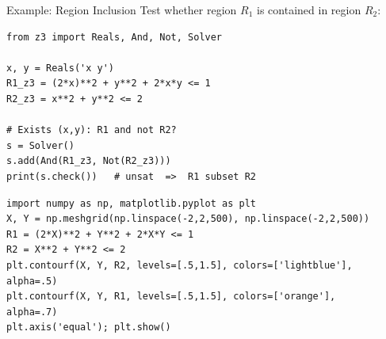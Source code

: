 \documentclass[aspectratio=169]{beamer}
\begin{document}
\begin{frame}[fragile]{Example: Region Inclusion}
  Test whether region $R_{1}$ is contained in region $R_{2}$:

  \begin{lstlisting}[style=python]
from z3 import Reals, And, Not, Solver

x, y = Reals('x y')
R1_z3 = (2*x)**2 + y**2 + 2*x*y <= 1
R2_z3 = x**2 + y**2 <= 2

# Exists (x,y): R1 and not R2?
s = Solver()
s.add(And(R1_z3, Not(R2_z3)))
print(s.check())   # unsat  =>  R1 subset R2
  \end{lstlisting}

  \begin{lstlisting}[style=python]
import numpy as np, matplotlib.pyplot as plt
X, Y = np.meshgrid(np.linspace(-2,2,500), np.linspace(-2,2,500))
R1 = (2*X)**2 + Y**2 + 2*X*Y <= 1
R2 = X**2 + Y**2 <= 2
plt.contourf(X, Y, R2, levels=[.5,1.5], colors=['lightblue'], alpha=.5)
plt.contourf(X, Y, R1, levels=[.5,1.5], colors=['orange'],    alpha=.7)
plt.axis('equal'); plt.show()
  \end{lstlisting}
\end{frame}
\end{document}
